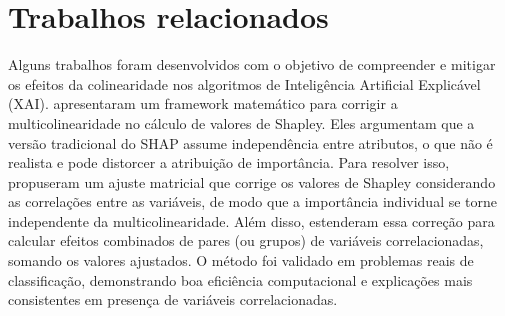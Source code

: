 



\section{Trabalhos relacionados}\label{sec:trabalhos_relacionados}

Alguns trabalhos foram desenvolvidos com o objetivo de compreender e mitigar os efeitos da colinearidade nos algoritmos de Inteligência Artificial Explicável (XAI).  apresentaram um framework matemático para corrigir a multicolinearidade no cálculo de valores de Shapley. Eles argumentam que a versão tradicional do SHAP assume independência entre atributos, o que não é realista e pode distorcer a atribuição de importância. Para resolver isso, propuseram um ajuste matricial que corrige os valores de Shapley considerando as correlações entre as variáveis, de modo que a importância individual se torne independente da multicolinearidade. Além disso, estenderam essa correção para calcular efeitos combinados de pares (ou grupos) de variáveis correlacionadas, somando os valores ajustados. O método foi validado em problemas reais de classificação, demonstrando boa eficiência computacional e explicações mais consistentes em presença de variáveis correlacionadas.

